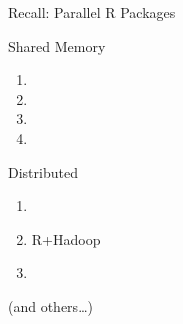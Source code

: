 \begin{frame}
  \begin{block}{Recall: Parallel R Packages}
   \begin{center}
    \begin{minipage}{.45\textwidth}
    \begin{block}{Shared Memory}
      \begin{enumerate}[<+-|alert@+>]
        \item {}
        \item {}
        \item {}
        \item {}
      \end{enumerate}
    \end{block}
    \end{minipage}
    \hspace{.2cm}
    \begin{minipage}{.45\textwidth}
    \begin{block}{Distributed}
      \begin{enumerate}[<+-|alert@+>]
        \item {}
        \item R+Hadoop
        \item {}
      \end{enumerate}
    \end{block}
    \end{minipage}
    \end{center}
    (and others\dots)
    \end{block}
\end{frame}



